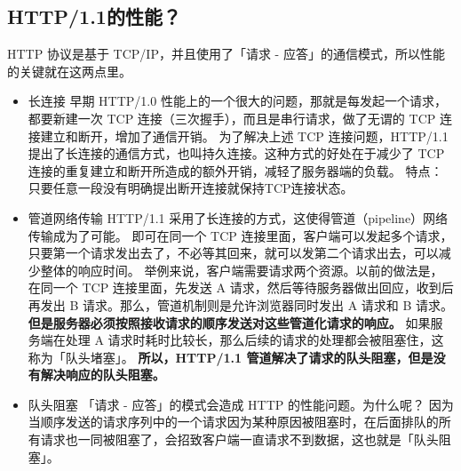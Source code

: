 \documentclass[11pt]{article}
\begin{document}
\subsection{HTTP/1.1的性能？}
\label{sec:org3338df5}
HTTP 协议是基于 TCP/IP，并且使用了「请求 - 应答」的通信模式，所以性能的关键就在这两点里。
\begin{itemize}
\item 长连接
早期 HTTP/1.0 性能上的一个很大的问题，那就是每发起一个请求，都要新建一次 TCP 连接（三次握手），而且是串行请求，做了无谓的 TCP 连接建立和断开，增加了通信开销。
为了解决上述 TCP 连接问题，HTTP/1.1 提出了长连接的通信方式，也叫持久连接。这种方式的好处在于减少了 TCP 连接的重复建立和断开所造成的额外开销，减轻了服务器端的负载。
特点：只要任意一段没有明确提出断开连接就保持TCP连接状态。
\item 管道网络传输
HTTP/1.1 采用了长连接的方式，这使得管道（pipeline）网络传输成为了可能。
即可在同一个 TCP 连接里面，客户端可以发起多个请求，只要第一个请求发出去了，不必等其回来，就可以发第二个请求出去，可以减少整体的响应时间。
举例来说，客户端需要请求两个资源。以前的做法是，在同一个 TCP 连接里面，先发送 A 请求，然后等待服务器做出回应，收到后再发出 B 请求。那么，管道机制则是允许浏览器同时发出 A 请求和 B 请求。
\textbf{但是服务器必须按照接收请求的顺序发送对这些管道化请求的响应。}
如果服务端在处理 A 请求时耗时比较长，那么后续的请求的处理都会被阻塞住，这称为「队头堵塞」。
\textbf{所以，HTTP/1.1 管道解决了请求的队头阻塞，但是没有解决响应的队头阻塞。}
\item 队头阻塞
「请求 - 应答」的模式会造成 HTTP 的性能问题。为什么呢？
因为当顺序发送的请求序列中的一个请求因为某种原因被阻塞时，在后面排队的所有请求也一同被阻塞了，会招致客户端一直请求不到数据，这也就是「队头阻塞」。
\end{itemize}
\end{document}
